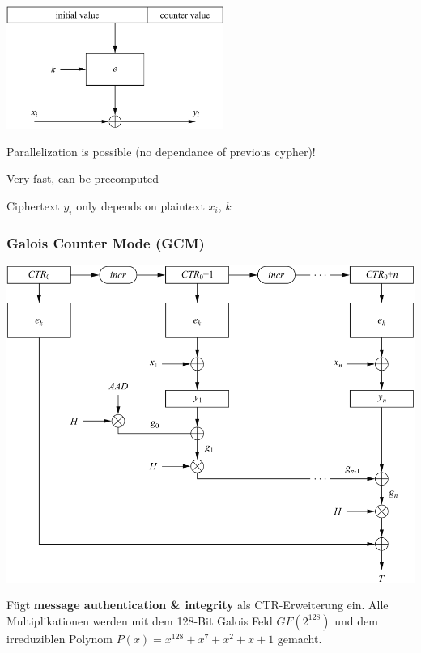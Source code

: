 \documentclass[
  10pt,
  a4paper,
]{article}
\begin{document}
\begin{multicols*}{2}
\begin{center}
\includegraphics[width=\textwidth,height=4cm]{images/crypto/image-4.png}
\end{center}

{\footnotesize\begin{description}[parsep=0mm,labelsep=2pt,labelwidth=8pt]
  \item[\color{OliveGreen}\faPlus] Parallelization is possible (no dependance of previous cypher)!
  \item[\color{OliveGreen}\faPlus]  Very fast, can be precomputed
  \item[\color{BrickRed}\faMinus] Ciphertext 
  $y_i$ only depends on plaintext $x_i$, $k$
\end{description}}

\subsubsection{Galois Counter Mode (GCM)}\label{galois-counter-mode-gcm}

\includegraphics{images/crypto/image-5.png}

Fügt \textbf{message authentication \& integrity} als CTR-Erweiterung
ein. Alle Multiplikationen werden mit dem 128-Bit Galois Feld
\(GF(2^128)\) und dem irreduziblen Polynom
\(P(x) = x^{128} +x^7 +x^2 +x+1\) gemacht.


\end{multicols*}
\end{document}
